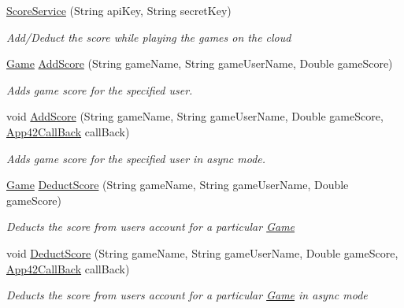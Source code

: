 \begin{DoxyCompactItemize}
\item 
\hyperlink{classcom_1_1shephertz_1_1app42_1_1paas_1_1sdk_1_1csharp_1_1game_1_1_score_service_a8539d90a8b87056dff6e29dd0d51d94f}{Score\+Service} (String api\+Key, String secret\+Key)
\begin{DoxyCompactList}\small\item\em Add/\+Deduct the score while playing the games on the cloud \end{DoxyCompactList}\item 
\hyperlink{classcom_1_1shephertz_1_1app42_1_1paas_1_1sdk_1_1csharp_1_1game_1_1_game}{Game} \hyperlink{classcom_1_1shephertz_1_1app42_1_1paas_1_1sdk_1_1csharp_1_1game_1_1_score_service_a700ac1ef078c9f3bc4f9c3d183b97ccd}{Add\+Score} (String game\+Name, String game\+User\+Name, Double game\+Score)
\begin{DoxyCompactList}\small\item\em Adds game score for the specified user. \end{DoxyCompactList}\item 
void \hyperlink{classcom_1_1shephertz_1_1app42_1_1paas_1_1sdk_1_1csharp_1_1game_1_1_score_service_ad160c52455dc8c17161a73b0b64ddbde}{Add\+Score} (String game\+Name, String game\+User\+Name, Double game\+Score, \hyperlink{interfacecom_1_1shephertz_1_1app42_1_1paas_1_1sdk_1_1csharp_1_1_app42_call_back}{App42\+Call\+Back} call\+Back)
\begin{DoxyCompactList}\small\item\em Adds game score for the specified user in async mode. \end{DoxyCompactList}\item 
\hyperlink{classcom_1_1shephertz_1_1app42_1_1paas_1_1sdk_1_1csharp_1_1game_1_1_game}{Game} \hyperlink{classcom_1_1shephertz_1_1app42_1_1paas_1_1sdk_1_1csharp_1_1game_1_1_score_service_a31a4ae34a0de4d391b20413b857d479a}{Deduct\+Score} (String game\+Name, String game\+User\+Name, Double game\+Score)
\begin{DoxyCompactList}\small\item\em Deducts the score from users account for a particular \hyperlink{classcom_1_1shephertz_1_1app42_1_1paas_1_1sdk_1_1csharp_1_1game_1_1_game}{Game} \end{DoxyCompactList}\item 
void \hyperlink{classcom_1_1shephertz_1_1app42_1_1paas_1_1sdk_1_1csharp_1_1game_1_1_score_service_ad4a01ab7520f744285411a7319c40479}{Deduct\+Score} (String game\+Name, String game\+User\+Name, Double game\+Score, \hyperlink{interfacecom_1_1shephertz_1_1app42_1_1paas_1_1sdk_1_1csharp_1_1_app42_call_back}{App42\+Call\+Back} call\+Back)
\begin{DoxyCompactList}\small\item\em Deducts the score from users account for a particular \hyperlink{classcom_1_1shephertz_1_1app42_1_1paas_1_1sdk_1_1csharp_1_1game_1_1_game}{Game} in async mode \end{DoxyCompactList}\end{DoxyCompactItemize}
